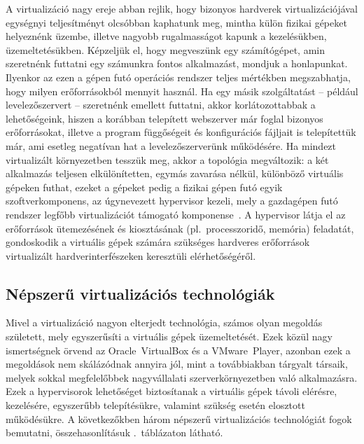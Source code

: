 A virtualizáció nagy ereje abban rejlik, hogy bizonyos hardverek virtualizációjával egységnyi teljesítményt olcsóbban kaphatunk meg, mintha külön fizikai gépeket helyeznénk üzembe, illetve nagyobb rugalmasságot kapunk a kezelésükben, üzemeltetésükben. Képzeljük el, hogy megveszünk egy számítógépet, amin szeretnénk futtatni egy számunkra fontos alkalmazást, mondjuk a honlapunkat. Ilyenkor az ezen a gépen futó operációs rendszer teljes mértékben megszabhatja, hogy milyen erőforrásokból mennyit használ. Ha egy másik szolgáltatást -- például levelezőszervert -- szeretnénk emellett futtatni, akkor korlátozottabbak a lehetőségeink, hiszen a korábban telepített webszerver már foglal bizonyos erőforrásokat, illetve a program függőségeit és konfigurációs fájljait is telepítettük már, ami esetleg negatívan hat a levelezőszerverünk működésére. Ha mindezt virtualizált környezetben tesszük meg, akkor a topológia megváltozik: a két alkalmazás teljesen elkülönítetten, egymás zavarása nélkül, különböző virtuális gépeken futhat, ezeket a gépeket pedig a fizikai gépen futó egyik szoftverkomponens, az úgynevezett \gls{hypervisor} kezeli, mely a gazdagépen futó rendszer legfőbb virtualizációt támogató komponense~\cite{Sles15virt}. A \gls{hypervisor} látja el az erőforrások ütemezésének és kiosztásának (pl.~processzoridő, memória) feladatát, gondoskodik a virtuális gépek számára szükséges hardveres erőforrások virtualizált hardverinterfészeken keresztüli elérhetőségéről.

\subsection{Népszerű virtualizációs technológiák}
Mivel a virtualizáció nagyon elterjedt technológia, számos olyan megoldás született, mely egyszerűsíti a virtuális gépek üzemeltetését. Ezek közül nagy ismertségnek örvend az Oracle~VirtualBox és a VMware~Player, azonban ezek a megoldások nem skálázódnak annyira jól, mint a továbbiakban tárgyalt társaik, melyek sokkal megfelelőbbek nagyvállalati szerverkörnyezetben való alkalmazásra. Ezek a \gls{hypervisor}ok lehetőséget biztosítanak a virtuális gépek távoli elérésre, kezelésére, egyszerűbb telepítésükre, valamint szükség esetén elosztott működésükre. A következőkben három népszerű virtualizációs technológiát fogok bemutatni, összehasonlításuk .~táblázaton látható.

